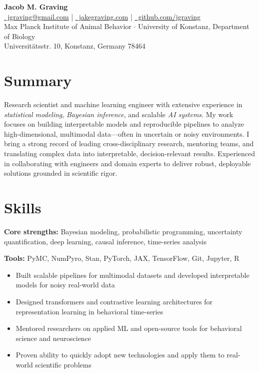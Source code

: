 \documentclass[10pt,letterpaper]{article}
\begin{document}
	
\begin{center}
	{\huge \textbf{Jacob M. Graving}}\\[6pt]
	\href{mailto:jgraving@gmail.com}{\faEnvelope\ jgraving@gmail.com}
	\quad | \quad
	\href{http://jakegraving.com/}{\faGlobe\ jakegraving.com}
	\quad | \quad
	\href{https://github.com/jgraving}{\faGithub\ github.com/jgraving}\\[8pt]
	
	{\small
		Max Planck Institute of Animal Behavior \quad $\cdot$ \quad
		University of Konstanz, Department of Biology \\
		Universit\"{a}tsstr. 10, Konstanz, Germany 78464
	}
\end{center}

\section*{Summary}
Research scientist and machine learning engineer with extensive experience in \textit{statistical modeling}, \textit{Bayesian inference}, and scalable \textit{AI systems}. My work focuses on building interpretable models and reproducible pipelines to analyze high-dimensional, multimodal data—often in uncertain or noisy environments. I bring a strong record of leading cross-disciplinary research, mentoring teams, and translating complex data into interpretable, decision-relevant results. Experienced in collaborating with engineers and domain experts to deliver robust, deployable solutions grounded in scientific rigor.

\section*{Skills}
\textbf{Core strengths:} Bayesian modeling, probabilistic programming, uncertainty quantification, deep learning, causal inference, time-series analysis

\textbf{Tools:} PyMC, NumPyro, Stan, PyTorch, JAX, TensorFlow, Git, Jupyter, R

\begin{itemize}
	\item Built scalable pipelines for multimodal datasets and developed interpretable models for noisy real-world data
	\item Designed transformers and contrastive learning architectures for representation learning in behavioral time-series
	\item Mentored researchers on applied ML and open-source tools for behavioral science and neuroscience
	\item Proven ability to quickly adopt new technologies and apply them to real-world scientific problems
\end{itemize}
\end{document}
